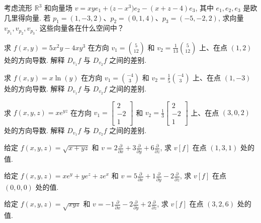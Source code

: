 \begin{question}\label{q:2-19}
考虑流形 $\mathbb{R}^3$ 和向量场 $v=xye_1+\bigl(z-x^3\bigr)e_2-(x+z-4)e_3$, 其中 $e_1,e_2,e_3$ 是欧几里得向量. 若 $p_1=(1,-3,2)$、$p_2=(0,1,4)$、$p_3=(-5,-2,2)$, 求向量 $v_{p_1},v_{p_2},v_{p_3}$. 这些向量各在什么空间中？
\end{question}

\begin{question}\label{q:2-20}
求 $f(x,y)=5x^2y-4xy^3$ 在方向 $v_1=\binom{5}{12}$ 和 $v_2=\frac{1}{13}\binom{5}{12}$ 上、在点 $(1,2)$ 处的方向导数. 解释 $D_{v_1}f$ 与 $D_{v_2}f$ 之间的差别.
\end{question}

\begin{question}\label{q:2-21}
求 $f(x,y)=x\ln(y)$ 在方向 $v_1=\binom{-4}{3}$ 和 $v_2=\frac{1}{5}\binom{-4}{3}$ 上、在点 $(1,-3)$ 处的方向导数. 解释 $D_{v_1}f$ 与 $D_{v_2}f$ 之间的差别.
\end{question}

\begin{question}\label{q:2-22}
求 $f(x,y,z)=xe^{yz}$ 在方向 $v_1=\begin{bmatrix}2\\-2\\1\end{bmatrix}$ 和 $v_2=\frac{1}{3}\begin{bmatrix}2\\-2\\1\end{bmatrix}$ 上、在点 $(3,0,2)$ 处的方向导数. 解释 $D_{v_1}f$ 与 $D_{v_2}f$ 之间的差别.
\end{question}

\begin{question}\label{q:2-23}
给定 $f(x,y,z)=\sqrt{x+yz}$ 和 $v=2\frac{\partial}{\partial x}+3\frac{\partial}{\partial y}+6\frac{\partial}{\partial z}$, 求 $v[f]$ 在点 $(1,3,1)$ 处的值.
\end{question}

\begin{question}\label{q:2-24}
给定 $f(x,y,z)=xe^y+ye^z+ze^x$ 和 $v=5\frac{\partial}{\partial x}+1\frac{\partial}{\partial y}-2\frac{\partial}{\partial z}$, 求 $v[f]$ 在点 $(0,0,0)$ 处的值.
\end{question}

\begin{question}\label{q:2-25}
给定 $f(x,y,z)=\sqrt{xyz}$ 和 $v=-1\frac{\partial}{\partial x}-2\frac{\partial}{\partial y}+2\frac{\partial}{\partial z}$, 求 $v[f]$ 在点 $(3,2,6)$ 处的值.
\end{question}


